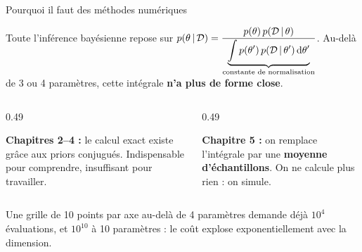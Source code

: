 \begin{frame}{Pourquoi il faut des méthodes numériques}
\begin{ebox}
Toute l'inférence bayésienne repose sur
$p(\theta \,\vert\, \mathcal{D}) = \dfrac{p(\theta)\,p(\mathcal{D} \,\vert\, \theta)}
{\underbrace{\int p(\theta')\,p(\mathcal{D} \,\vert\, \theta')\,\mathrm{d}\theta'}_{\text{constante de normalisation}}}$.
Au-delà de 3 ou 4 paramètres, cette intégrale \textbf{n'a plus de forme close}.
\end{ebox}
\vspace{1mm}
\begin{columns}[t]
\begin{column}{0.49\textwidth}
\begin{tcolorbox}[colback=byCyan!8,colframe=byCyan,arc=2mm]
\small\textbf{Chapitres 2--4 :} le calcul exact existe grâce aux priors conjugués.
Indispensable pour comprendre, insuffisant pour travailler.
\end{tcolorbox}
\end{column}
\begin{column}{0.49\textwidth}
\begin{tcolorbox}[colback=byPurple!8,colframe=byPurple,arc=2mm]
\small\textbf{Chapitre 5 :} on remplace l'intégrale par une \textbf{moyenne
d'échantillons}. On ne calcule plus rien : on simule.
\end{tcolorbox}
\end{column}
\end{columns}
\vspace{1mm}
\begin{wbox}
Une grille de 10 points par axe au-delà de 4 paramètres demande déjà
$10^4$ évaluations, et $10^{10}$ à 10 paramètres : le coût explose
exponentiellement avec la dimension.
\end{wbox}
\end{frame}


